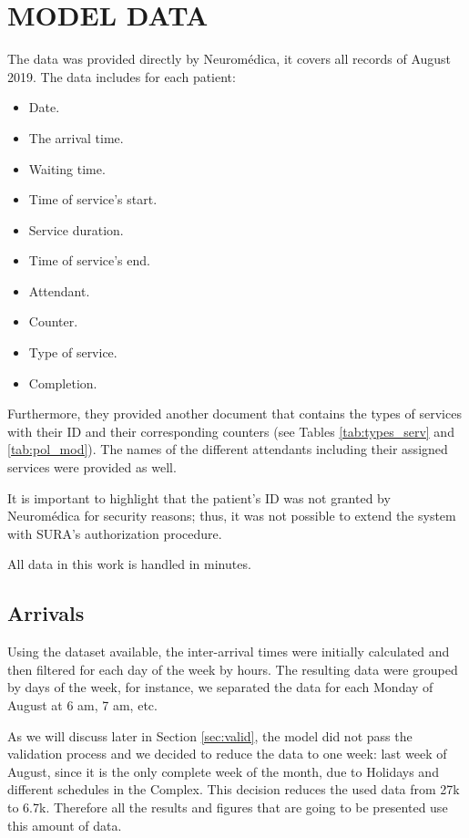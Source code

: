 \section{MODEL DATA}\label{sec:data}

The data was provided directly by Neuromédica, it covers all records of August 2019. The data includes for each patient:

\begin{itemize}
\item Date.
\item The arrival time.
\item Waiting time.
\item Time of service's start.
\item Service duration.
\item Time of service's end.
\item Attendant.
\item Counter.
\item Type of service.
\item Completion.
\end{itemize}

Furthermore, they provided another document that contains the types of services with their ID and their corresponding counters (see Tables \ref{tab:types_serv} and \ref{tab:pol_mod}). The names of the different attendants including their assigned services were provided as well.

It is important to highlight that the patient's ID was not granted by Neuromédica for security reasons; thus, it was not possible to extend the system with SURA's authorization procedure.

All data in this work is handled in minutes.

\subsection{Arrivals}
Using the dataset available, the inter-arrival times were initially calculated and then filtered for each day of the week by hours. The resulting data were grouped by days of the week, for instance, we separated the  data for each Monday of August at 6 am, 7 am, etc.

As we will discuss later in Section \ref{sec:valid}, the model did not pass the validation process and we decided to reduce the data to one week: last week of August, since it is the only complete week of the month, due to Holidays and different schedules in the Complex. This decision reduces the used data from 27k to 6.7k. Therefore all the results and figures that are going to be presented use this amount of data.



